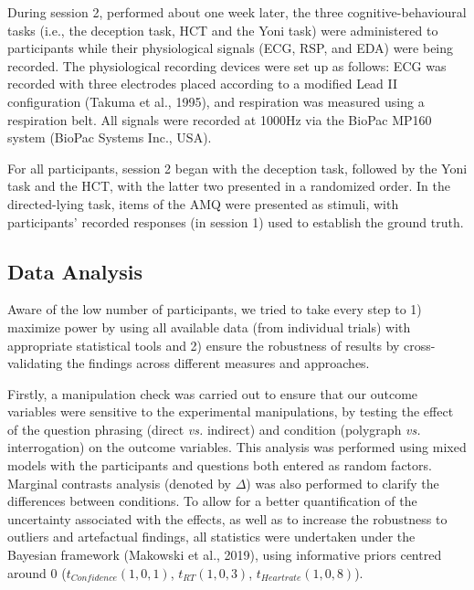 \documentclass[
  man,mask,floatsintext]{apa6}
\begin{document}
During session 2, performed about one week later, the three cognitive-behavioural tasks (i.e., the deception task, HCT and the Yoni task) were administered to participants while their physiological signals (ECG, RSP, and EDA) were being recorded. The physiological recording devices were set up as follows: ECG was recorded with three electrodes placed according to a modified Lead II configuration (Takuma et al., 1995), and respiration was measured using a respiration belt. All signals were recorded at 1000Hz via the BioPac MP160 system (BioPac Systems Inc., USA).

For all participants, session 2 began with the deception task, followed by the Yoni task and the HCT, with the latter two presented in a randomized order. In the directed-lying task, items of the AMQ were presented as stimuli, with participants' recorded responses (in session 1) used to establish the ground truth.

\hypertarget{data-analysis}{%
\subsection{Data Analysis}\label{data-analysis}}

Aware of the low number of participants, we tried to take every step to 1) maximize power by using all available data (from individual trials) with appropriate statistical tools and 2) ensure the robustness of results by cross-validating the findings across different measures and approaches.

Firstly, a manipulation check was carried out to ensure that our outcome variables were sensitive to the experimental manipulations, by testing the effect of the question phrasing (direct \emph{vs.} indirect) and condition (polygraph \emph{vs.} interrogation) on the outcome variables. This analysis was performed using mixed models with the participants and questions both entered as random factors. Marginal contrasts analysis (denoted by \(\Delta\)) was also performed to clarify the differences between conditions. To allow for a better quantification of the uncertainty associated with the effects, as well as to increase the robustness to outliers and artefactual findings, all statistics were undertaken under the Bayesian framework (Makowski et al., 2019), using informative priors centred around 0 (\(t_{Confidence}(1, 0, 1)\), \(t_{RT}(1, 0, 3)\), \(t_{Heartrate}(1, 0, 8)\)).
\end{document}
